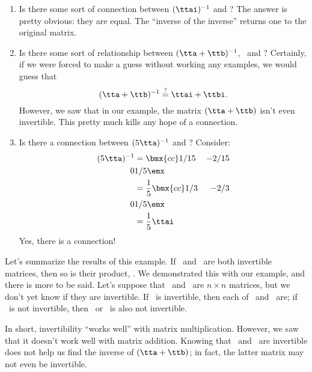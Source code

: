 {\begin{enumerate}
\item		Is there some sort of connection between $(\ttai)^{-1}$ and \tta? The answer is pretty obvious: they are equal. The ``inverse of the inverse'' returns one to the original matrix.


\item		Is there some sort of relationship between $(\tta+\ttb)^{-1}$, \ttai\ and \ttbi? Certainly, if we were forced to make a guess without working any examples, we would guess that 
\[
(\tta+\ttb)^{-1} \overset{\text{?}}{=} \ttai+\ttbi.
\]
However, we saw that in our example, the matrix $(\tta+\ttb)$ isn't even invertible. This pretty much kills any hope of a connection.

\item		Is there a connection between $(5\tta)^{-1}$ and \ttai? Consider:
	\begin{align*} 
   (5\tta)^{-1} &= \bmx{cc} 1/15 & -2/15\\ 0 & 1/5\emx \\
				&= \frac{1}{5} \bmx{cc} 1/3 & -2/3\\0&1/5\emx \\
				&= \frac 15 \ttai
	\end{align*}
\enlargethispage{2\baselineskip}	
	Yes, there is a connection!
\end{enumerate}
} 

\medskip

Let's summarize the results of this example. If \tta\ and \ttb\ are both invertible matrices, then so is their product, \tta\ttb. We demonstrated this with our example, and there is more to be said. Let's suppose that \tta\ and \ttb\ are $n\times n$ matrices, but we don't yet know if they are invertible. If \tta\ttb\ is invertible, then each of \tta\ and \ttb\ are; if \tta\ttb\ is not invertible, then \tta\ or \ttb\ is also not invertible.

In short, invertibility ``works well'' with matrix multiplication. However, we saw that it doesn't work well with matrix addition. Knowing that \tta\ and \ttb\ are invertible does not help us find the inverse of $(\tta+\ttb)$; in fact, the latter matrix may not even be invertible.


